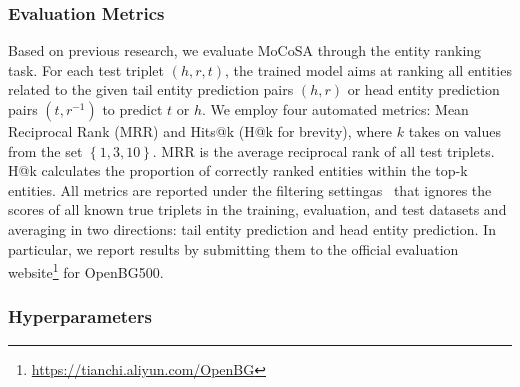 \documentclass[11pt]{article}
\begin{document}
\subsubsection{Evaluation Metrics}
Based on previous research, we evaluate MoCoSA through the entity ranking task. For each test triplet $(h, r, t)$, the trained model aims at ranking all entities related to the given tail entity prediction pairs $(h,r)$ or head entity prediction pairs $(t,r^{-1})$ to predict $t$ or $h$. We employ four automated metrics: Mean Reciprocal Rank (MRR) and Hits@k (H@k for brevity), where $k$ takes on values from the set $\left\{1, 3, 10\right\}$. MRR is the average reciprocal rank of all test triplets. H@k calculates the proportion of correctly ranked entities within the top-k entities. All metrics are reported under the filtering settingas~\cite{Bordes2013TranslatingEF} that ignores the scores of all known true triplets in the training, evaluation, and test datasets and averaging in two directions: tail entity prediction and head entity prediction. In particular, we report results by submitting them to the official evaluation website\footnote{\url{https://tianchi.aliyun.com/OpenBG}} for OpenBG500.

\subsubsection{Hyperparameters}
\end{document}
